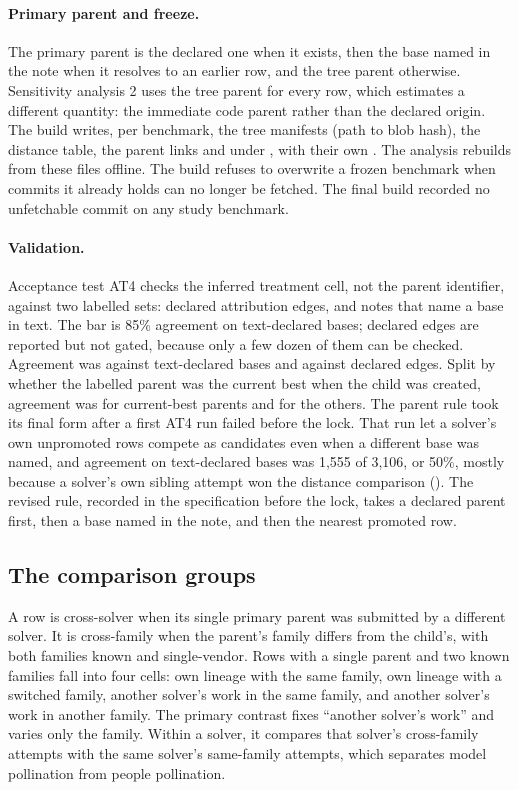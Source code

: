 \paragraph{Primary parent and freeze.}
The primary parent is the declared one when it exists, then the base named in the note when it resolves to an earlier row, and the tree parent otherwise.
Sensitivity analysis 2 uses the tree parent for every row, which estimates a different quantity: the immediate code parent rather than the declared origin.
The build writes, per benchmark, the tree manifests (path to blob hash), the distance table, the parent links and  under , with their own .
The analysis rebuilds from these files offline.
The build refuses to overwrite a frozen benchmark when commits it already holds can no longer be fetched.
The final build recorded no unfetchable commit on any study benchmark.

\paragraph{Validation.}
Acceptance test AT4 checks the inferred treatment cell, not the parent identifier, against two labelled sets: declared attribution edges, and notes that name a base in text.
The bar is 85\% agreement on text-declared bases; declared edges are reported but not gated, because only a few dozen of them can be checked.
Agreement was \ATFourTextAgree{} against text-declared bases and \ATFourDeclaredAgree{} against declared edges.
Split by whether the labelled parent was the current best when the child was created, agreement was \ATFourFrontierAgree{} for current-best parents and \ATFourNonFrontierAgree{} for the others.
The parent rule took its final form after a first AT4 run failed before the lock.
That run let a solver's own unpromoted rows compete as candidates even when a different base was named, and agreement on text-declared bases was 1,555 of 3,106, or 50\%, mostly because a solver's own sibling attempt won the distance comparison ().
The revised rule, recorded in the specification before the lock, takes a declared parent first, then a base named in the note, and then the nearest promoted row.

\subsection{The comparison groups}
\label{sec:cells}

A row is cross-solver when its single primary parent was submitted by a different solver.
It is cross-family when the parent's family differs from the child's, with both families known and single-vendor.
Rows with a single parent and two known families fall into four cells: own lineage with the same family, own lineage with a switched family, another solver's work in the same family, and another solver's work in another family.
The primary contrast fixes ``another solver's work'' and varies only the family.
Within a solver, it compares that solver's cross-family attempts with the same solver's same-family attempts, which separates model pollination from people pollination.

